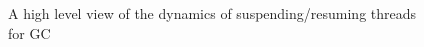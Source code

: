 \begin{figure}[h]
\begin{center}
\begin{tikzpicture}
\end{tikzpicture}
\end{center}
\caption{\label{GC-Overview}
  A high level view of the dynamics of suspending/resuming threads for GC}
\end{figure}
